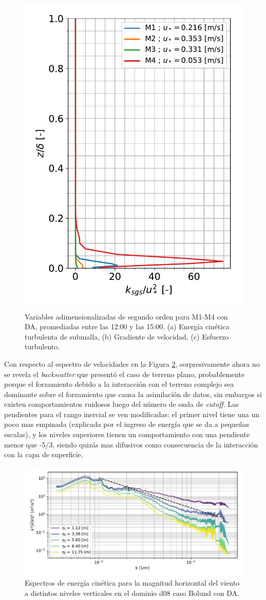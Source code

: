 \begin{figure}[H]
\begin{center}
		\includegraphics[height=0.5\linewidth,page=3,trim={12mm 5mm 3mm 0mm},clip]{Imagenes/06/bol_da/second_order_mean}%
	\end{center}
	\vspace{-5mm}
	\caption{Variables adimensionalizadas de segundo orden para M1-M4 con DA, promediadas entre las 12:00 y las 15:00. (a) Energía cinética turbulenta de submalla, (b) Gradiente de velocidad, (c) Esfuerzo turbulento. }
	\label{fig:06_bol_da_mean_secondorder}
\end{figure}
Con respecto al espectro de velocidades en la Figura \ref{fig:06_bol_da_spectrum}, sorpresivamente ahora no se revela el \emph{backscatter} que presentó el caso de terreno plano, probablemente porque el forzamiento debido a la interacción con el terreno complejo sea dominante sobre el forzamiento que causa la asimilación de datos, sin embargos si existen comportamientos ruidosos luego del número de onda de \emph{cutoff}. Las pendientes para el rango inercial se ven modificadas: el primer nivel tiene una un poco mas empinada (explicada por el ingreso de energía que se da a pequeñas escalas), y los niveles superiores tienen un comportamiento con una pendiente menor que -5/3, siendo quizás mas difusivos como consecuencia de la interacción con la capa de superficie.
\newpage
\begin{figure}[H]
	\centering
	\includegraphics[width=1.0\linewidth,page=1,trim={3mm 5mm 3mm 3mm},clip]{Imagenes/06/bol_da/spectra}%
	\caption{Espectros de energía cinética para la magnitud horizontal del viento a distintos niveles verticales en el dominio d08 caso Bolund con DA.}
	\label{fig:06_bol_da_spectrum}
\end{figure}
